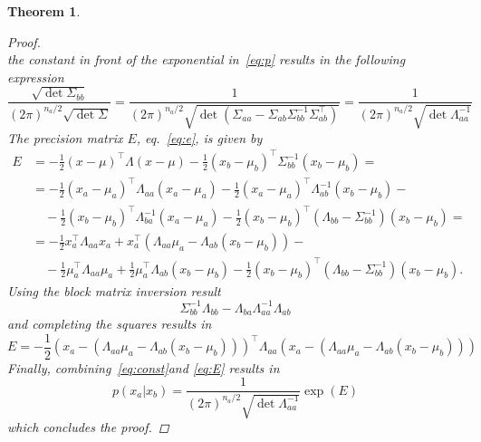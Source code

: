 \documentclass{article}[12pt]
\newtheorem{theorem}{Theorem}
\begin{document}
\begin{theorem}
\begin{proof}
\begin{equation}
		\end{equation}
		the constant in front of the exponential in~\eqref{eq:p} results in the following expression
		\begin{equation}
		\label{eq:const}
		  \frac{\sqrt{\det\Sigma_{bb}}}{(2\pi)^{n_a/2} \sqrt{\det \Sigma}} = 
		 \frac{1}{(2\pi)^{n_a/2} \sqrt{\det (\Sigma_{aa}- \Sigma_{ab}\Sigma_{bb}^{-1} \Sigma_{ab}^\top)}} = 
		 \frac{1}{(2\pi)^{n_a/2} \sqrt{\det \Lambda_{aa}^{-1}}}
		\end{equation}
		The precision
		matrix $E$, eq.~\eqref{eq:e}, is given by
		\begin{align*}
		E &= -\frac{1}{2}(x-\mu)^{\top} \Lambda (x-\mu) -
		\frac{1}{2}(x_b-\mu_b)^{\top} \Sigma_{bb}^{-1} (x_b-\mu_b) = \\
		& = 
		-\frac{1}{2}(x_a-\mu_a)^{\top} \Lambda_{aa} (x_a-\mu_a) -
		\frac{1}{2}(x_a-\mu_a)^{\top} \Lambda_{ab}^{-1} (x_b-\mu_b)-\\ 
		&\quad-
		\frac{1}{2}(x_b-\mu_b)^{\top} \Lambda_{ba}^{-1} (x_a-\mu_a) 
		-
		\frac{1}{2}(x_b-\mu_b)^{\top} (\Lambda_{bb}-\Sigma_{bb}^{-1}) (x_b-\mu_b) 
		=\\
		&= 
		-\frac{1}{2}x_a^{\top} \Lambda_{aa} x_a + 
		x_a^\top (\Lambda_{aa}\mu_a -\Lambda_{ab}(x_b-\mu_b) ) - \\
		&\quad - \frac{1}{2}\mu_a^{\top} \Lambda_{aa} \mu_a + 
		\frac{1}{2}\mu_a^{\top} \Lambda_{ab} (x_b-\mu_b) - 
		 \frac{1}{2}(x_b-\mu_b)^\top (\Lambda_{bb}-\Sigma_{bb}^{-1})(x_b-\mu_b).
		\end{align*}
		Using the block matrix inversion result
		\begin{equation}
		\Sigma_{bb}^{-1} \Lambda_{bb} - \Lambda_{ba} \Lambda_{aa}^{-1} \Lambda_{ab}
		\end{equation}
		and completing the squares results in 
		\begin{equation}
		\label{eq:E}
		E = -\frac{1}{2} (x_a - (\Lambda_{aa}\mu_a - \Lambda_{ab}(x_b-\mu_b)))^\top
		\Lambda_{aa} 
		(x_a - (\Lambda_{aa}\mu_a - \Lambda_{ab}(x_b-\mu_b)))
		\end{equation}
		Finally,  combining~\eqref{eq:const}and \eqref{eq:E} results in
		\begin{equation}
		p(x_a|x_b) = 
		 \frac{1}{(2\pi)^{n_a/2} \sqrt{\det \Lambda_{aa}^{-1}}} \exp(E)
		\end{equation}
		which concludes the proof.
	\end{proof}
\end{theorem}
 
\end{document}
